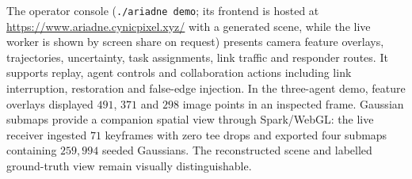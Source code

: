 \documentclass[11pt,a4paper]{article}
\begin{document}
The operator console (\texttt{./ariadne demo}; its frontend is hosted at \url{https://www.ariadne.cynicpixel.xyz/} with a generated scene, while the live worker is shown by screen share on request) presents camera feature overlays, trajectories, uncertainty, task assignments, link traffic and responder routes. It supports replay, agent controls and collaboration actions including link interruption, restoration and false-edge injection. In the three-agent demo, feature overlays displayed $491$, $371$ and $298$ image points in an inspected frame. Gaussian submaps provide a companion spatial view through Spark/WebGL: the live receiver ingested $71$ keyframes with zero tee drops and exported four submaps containing $259{,}994$ seeded Gaussians. The reconstructed scene and labelled ground-truth view remain visually distinguishable.
\end{document}
